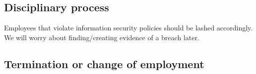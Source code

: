 \subsection{Disciplinary process}
Employees that violate information security policies should be lashed 
accordingly. We will worry about finding/creating evidence of a breach later.

\subsection{Termination or change of employment}


